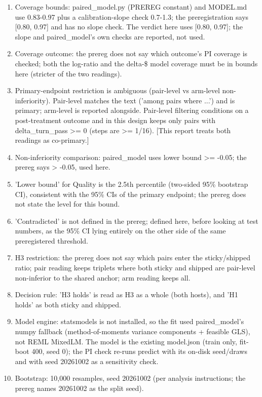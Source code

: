 \begin{enumerate}[leftmargin=1.4em]
\item Coverage bounds: paired\_model.py (PREREG constant) and MODEL.md use 0.83-0.97 plus a calibration-slope check 0.7-1.3; the preregistration says [0.80, 0.97] and has no slope check. The verdict here uses [0.80, 0.97]; the slope and paired\_model's own checks are reported, not used.
\item Coverage outcome: the prereg does not say which outcome's PI coverage is checked; both the log-ratio and the delta-\$ model coverage must be in bounds here (stricter of the two readings).
\item Primary-endpoint restriction is ambiguous (pair-level vs arm-level non-inferiority). Pair-level matches the text ('among pairs where ...') and is primary; arm-level is reported alongside. Pair-level filtering conditions on a post-treatment outcome and in this design keeps only pairs with delta\_turn\_pass >= 0 (steps are >= 1/16). [This report treats both readings as co-primary.]
\item Non-inferiority comparison: paired\_model uses lower bound >= -0.05; the prereg says > -0.05, used here.
\item 'Lower bound' for Quality is the 2.5th percentile (two-sided 95\% bootstrap CI), consistent with the 95\% CIs of the primary endpoint; the prereg does not state the level for this bound.
\item 'Contradicted' is not defined in the prereg; defined here, before looking at test numbers, as the 95\% CI lying entirely on the other side of the same preregistered threshold.
\item H3 restriction: the prereg does not say which pairs enter the sticky/shipped ratio; pair reading keeps triplets where both sticky and shipped are pair-level non-inferior to the shared anchor; arm reading keeps all.
\item Decision rule: 'H3 holds' is read as H3 as a whole (both hosts), and 'H1 holds' as both sticky and shipped.
\item Model engine: statsmodels is not installed, so the fit used paired\_model's numpy fallback (method-of-moments variance components + feasible GLS), not REML MixedLM. The model is the existing model.json (train only, fit-boot 400, seed 0); the PI check re-runs predict with its on-disk seed/draws and with seed 20261002 as a sensitivity check.
\item Bootstrap: 10,000 resamples, seed 20261002 (per analysis instructions; the prereg names 20261002 as the split seed).
\end{enumerate}
